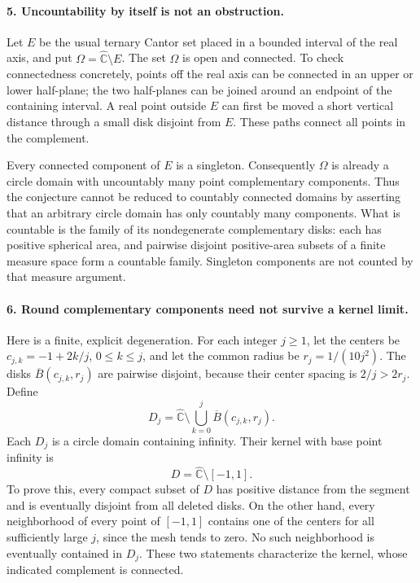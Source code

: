 \documentclass[11pt]{article}
\begin{document}
\paragraph{5. Uncountability by itself is not an obstruction.}
Let $E$ be the usual ternary Cantor set placed in a bounded interval of the real axis, and put $\Omega=\widehat{\mathbb C}\setminus E$. The set $\Omega$ is open and connected. To check connectedness concretely, points off the real axis can be connected in an upper or lower half-plane; the two half-planes can be joined around an endpoint of the containing interval. A real point outside $E$ can first be moved a short vertical distance through a small disk disjoint from $E$. These paths connect all points in the complement.

Every connected component of $E$ is a singleton. Consequently $\Omega$ is already a circle domain with uncountably many point complementary components. Thus the conjecture cannot be reduced to countably connected domains by asserting that an arbitrary circle domain has only countably many components. What is countable is the family of its nondegenerate complementary disks: each has positive spherical area, and pairwise disjoint positive-area subsets of a finite measure space form a countable family. Singleton components are not counted by that measure argument.

\paragraph{6. Round complementary components need not survive a kernel limit.}
Here is a finite, explicit degeneration. For each integer $j\geq1$, let the centers be $c_{j,k}=-1+2k/j$, $0\leq k\leq j$, and let the common radius be $r_j=1/(10j^2)$. The disks $\overline B(c_{j,k},r_j)$ are pairwise disjoint, because their center spacing is $2/j>2r_j$. Define
\[
 D_j=\widehat{\mathbb C}\setminus
 \bigcup_{k=0}^{j}\overline B(c_{j,k},r_j).
\]
Each $D_j$ is a circle domain containing infinity. Their kernel with base point infinity is
\[
 D=\widehat{\mathbb C}\setminus[-1,1].
\]
To prove this, every compact subset of $D$ has positive distance from the segment and is eventually disjoint from all deleted disks. On the other hand, every neighborhood of every point of $[-1,1]$ contains one of the centers for all sufficiently large $j$, since the mesh tends to zero. No such neighborhood is eventually contained in $D_j$. These two statements characterize the kernel, whose indicated complement is connected.
\end{document}
